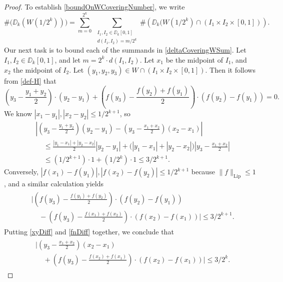 \begin{proof}
	To establish \eqref{boundOnWCoveringNumber}, we write
	\begin{equation}\label{deltaCoveringWSum}
		\# \bigl(\mathcal \DD_k(W(1/2^k)) \bigr) = \sum_{m = 0}^{2^k}\ \sum_{\substack{I_1, I_2 \in \DD_k[0,1]\\d(I_1,I_2) = m/2^k}} \# \left( \DD_k(W(1/2^k) \cap (I_1 \times I_2 \times [0,1]) \right).
	\end{equation}
	Our next task is to bound each of the summands in \eqref{deltaCoveringWSum}.
	 Let $I_1, I_2 \in \DD_k[0,1]$, and let $m = 2^k \cdot d(I_1,I_2)$. Let $x_1$ be the midpoint of $I_1$, and $x_2$ the midpoint of $I_2$. Let $(y_1,y_2,y_3) \in W \cap (I_1 \times I_2 \times [0,1])$. Then it follows from \eqref{def-H} that 
	\[ \left( y_3 - \frac{y_1 + y_2}{2} \right) \cdot (y_2 - y_1) + \left( f(y_3) - \frac{f(y_2) + f(y_1)}{2} \right) \cdot (f(y_2) - f(y_1)) = 0. \]
	We know $|x_1 - y_1|, |x_2 - y_2| \leq 1/2^{k+1}$, so
	\begin{align} \label{xyDiff}
		&\left| \left( y_3 - \frac{y_1 + y_2}{2} \right) (y_2 - y_1) - \left( y_3 - \frac{x_1 + x_2}{2} \right) (x_2 - x_1) \right| \nonumber\\
		&\ \ \ \ \ \leq \frac{|y_1 - x_1| + |y_2 - x_2|}{2} |y_2 - y_1| + \Big( |y_1 - x_1| + |y_2 - x_2| \Big) \left| y_3 - \frac{x_1 + x_2}{2} \right|\\
		&\ \ \ \ \ \leq (1/2^{k+1}) \cdot 1 + (1/2^k) \cdot 1 \leq 3/2^{k+1}. \nonumber
	\end{align}
	Conversely, $|f(x_1) - f(y_1)|, |f(x_2) - f(y_2)| \leq 1/2^{k+1}$ because $\| f \|_{\text{Lip}} \leq 1$, and a similar calculation yields
	\begin{align} \label{fnDiff}
	\begin{split}
		&\Big| \left( f(y_3) - \frac{f(y_1) + f(y_2)}{2} \right) \cdot (f(y_2) - f(y_1))\\
		&\ \ \ \ \ - \left( f(y_3) - \frac{f(x_1) + f(x_2)}{2} \right) \cdot (f(x_2) - f(x_1)) \Big|\leq 3/2^{k+1}.
	\end{split}
	\end{align}
	Putting \eqref{xyDiff} and \eqref{fnDiff} together, we conclude that
	\begin{align} \label{hyperplanethick}
	\begin{split}
		&\Big| \left( y_3 - \frac{x_1 + x_2}{2} \right) (x_2 - x_1)\\
		&\ \ \ \ \ + \left( f(y_3) - \frac{f(x_2) + f(x_1)}{2} \right) \cdot (f(x_2) - f(x_1)) \Big| \leq 3/2^k.
	\end{split}

\end{align}
\end{proof}
